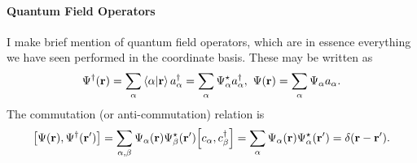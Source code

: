 \paragraph{Quantum Field Operators}
I make brief mention of quantum field operators, which are in essence everything we have seen performed in the coordinate basis. These may be written as
\begin{align*}
	\Psi^{\dagger}(\vb{r}) = \sum\limits_{\alpha}\braket{\alpha}{\vb{r}}a_{\alpha}^{\dagger} = \sum\limits_{\alpha}\Psi_{\alpha}^{\star}a_{\alpha}^{\dagger},\ \Psi(\vb{r}) = \sum\limits_{\alpha}\Psi_{\alpha}a_{\alpha}.
\end{align*}
The commutation (or anti-commutation) relation is
\begin{align*}
	\comm{\Psi(\vb{r})}{\adj{\Psi}(\vb{r}^{\prime})} = \sum\limits_{\alpha, \beta}\Psi_{\alpha}(\vb{r})\cc{\Psi_{\beta}}(\vb{r}^{\prime})\comm{c_{\alpha}}{\adj{c_{\beta}}} = \sum\limits_{\alpha}\Psi_{\alpha}(\vb{r})\cc{\Psi_{\alpha}}(\vb{r}^{\prime}) = \delta(\vb{r} - \vb{r}^{\prime}).
\end{align*}